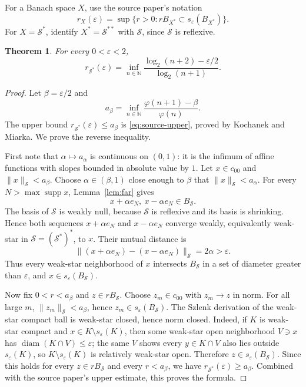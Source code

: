 \documentclass[11pt]{article}
\newtheorem{theorem}{Theorem}
\newcommand{\N}{\mathbb N}
\newcommand{\eps}{\varepsilon}
\newcommand{\ph}{\varphi}
\newcommand{\Ball}{B}
\DeclareMathOperator{\diam}{diam}
\DeclareMathOperator{\supp}{supp}
\begin{document}
For a Banach space $X$, use the source paper's notation
\[
 r_X(\eps)=\sup\{r>0:rB_{X^*}\subset s_\eps(B_{X^*})\}.
\]
For $X=\mathcal S^*$, identify $X^*=\mathcal S^{**}$ with $\mathcal S$,
since $\mathcal S$ is reflexive.

\begin{theorem}\label{thm:main}
For every $0<\eps<2$,
\[
 r_{\mathcal S^*}(\eps)=
 \inf_{n\in\N}
 \frac{\log_2(n+2)-\eps/2}{\log_2(n+1)}.
\]
\end{theorem}

\begin{proof}
Let $\beta=\eps/2$ and
\[
 a_\beta=\inf_{n\in\N}\frac{\ph(n+1)-\beta}{\ph(n)}.
\]
The upper bound $r_{\mathcal S^*}(\eps)\le a_\beta$ is
\eqref{eq:source-upper}, proved by Kochanek and Miarka.  We prove the
reverse inequality.

First note that $\alpha\mapsto a_\alpha$ is continuous on $(0,1)$:
it is the infimum of affine functions with slopes bounded in absolute value
by $1$.  Let $x\in c_{00}$ and $\|x\|_{\mathcal S}<a_\beta$.  Choose
$\alpha\in(\beta,1)$ close enough to $\beta$ that
$\|x\|_{\mathcal S}<a_\alpha$.  For every $N>\max\supp x$,
Lemma~\ref{lem:far} gives
\[
 x+\alpha e_N,\ x-\alpha e_N\in \Ball_{\mathcal S}.
\]
The basis of $\mathcal S$ is weakly null, because $\mathcal S$ is
reflexive and its basis is shrinking.  Hence both sequences
$x+\alpha e_N$ and $x-\alpha e_N$ converge weakly, equivalently
weak-star in $\mathcal S=(\mathcal S^*)^*$, to $x$.  Their mutual distance is
\[
 \|(x+\alpha e_N)-(x-\alpha e_N)\|_{\mathcal S}=2\alpha>\eps.
\]
Thus every weak-star neighborhood of $x$ intersects $\Ball_{\mathcal S}$
in a set of diameter greater than $\eps$, and $x\in s_\eps(\Ball_{\mathcal S})$.

Now fix $0<r<a_\beta$ and $z\in r\Ball_{\mathcal S}$.  Choose
$z_m\in c_{00}$ with $z_m\to z$ in norm.  For all large $m$,
$\|z_m\|_{\mathcal S}<a_\beta$, hence
$z_m\in s_\eps(\Ball_{\mathcal S})$.  The Szlenk derivation of the
weak-star compact ball is weak-star closed, hence norm closed.  Indeed, if
$K$ is weak-star compact and $x\in K\setminus s_\eps(K)$, then some
weak-star open neighborhood $V\ni x$ has $\diam(K\cap V)\le\eps$; the same
$V$ shows every $y\in K\cap V$ also lies outside $s_\eps(K)$, so
$K\setminus s_\eps(K)$ is relatively weak-star open.  Therefore
$z\in s_\eps(\Ball_{\mathcal S})$.  Since this holds for every
$z\in r\Ball_{\mathcal S}$ and every $r<a_\beta$, we have
$r_{\mathcal S^*}(\eps)\ge a_\beta$.  Combined with the source paper's
upper estimate, this proves the formula.
\end{proof}
\end{document}
